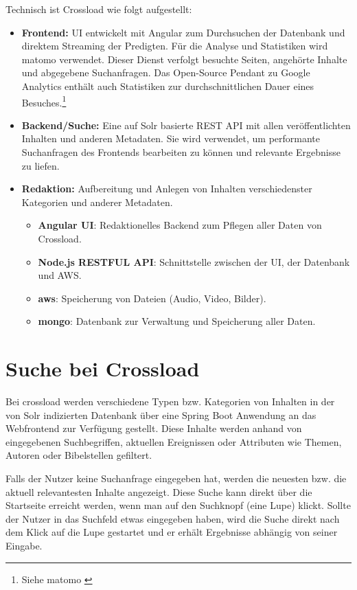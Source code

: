 Technisch ist Crossload wie folgt aufgestellt:
\begin{itemize}
  \item \textbf{Frontend:} UI entwickelt mit Angular zum Durchsuchen der Datenbank und direktem Streaming der Predigten. Für die Analyse und Statistiken wird \gls{matomo} verwendet. Dieser Dienst verfolgt besuchte Seiten, angehörte Inhalte und abgegebene Suchanfragen. Das Open-Source Pendant zu Google Analytics enthält auch Statistiken zur durchschnittlichen Dauer eines Besuches.\footnote{Siehe \gls{matomo} \cite{matomo2022}}
  \item \textbf{Backend/Suche:} Eine auf Solr basierte REST API mit allen veröffentlichten Inhalten und anderen Metadaten. Sie wird verwendet, um performante Suchanfragen des Frontends bearbeiten zu können und relevante Ergebnisse zu liefen.
  \item \textbf{Redaktion:} Aufbereitung und Anlegen von Inhalten verschiedenster Kategorien und anderer Metadaten.
  \begin{itemize}
    \item \textbf{Angular UI}: Redaktionelles Backend zum Pflegen aller Daten von Crossload.
    \item \textbf{Node.js RESTFUL API}: Schnittstelle zwischen der UI, der Datenbank und AWS.
    \item \textbf{\gls{aws}}: Speicherung von Dateien (Audio, Video, Bilder).
    \item \textbf{\gls{mongo}}: Datenbank zur Verwaltung und Speicherung aller Daten.
  \end{itemize}
\end{itemize}

\section{Suche bei Crossload}
\label{sec:implementedFunctionality}

Bei \gls{crossload} werden verschiedene Typen bzw. Kategorien von Inhalten in der von Solr indizierten Datenbank über eine Spring Boot Anwendung an das Webfrontend zur Verfügung gestellt.
Diese Inhalte werden anhand von eingegebenen Suchbegriffen, aktuellen Ereignissen oder Attributen wie Themen, Autoren oder Bibelstellen gefiltert.

Falls der Nutzer keine Suchanfrage eingegeben hat, werden die neuesten bzw. die aktuell relevantesten Inhalte angezeigt.
Diese Suche kann direkt über die Startseite erreicht werden, wenn man auf den Suchknopf (eine Lupe) klickt.
Sollte der Nutzer in das Suchfeld etwas eingegeben haben, wird die Suche direkt nach dem Klick auf die Lupe gestartet und er erhält Ergebnisse abhängig von seiner Eingabe.

